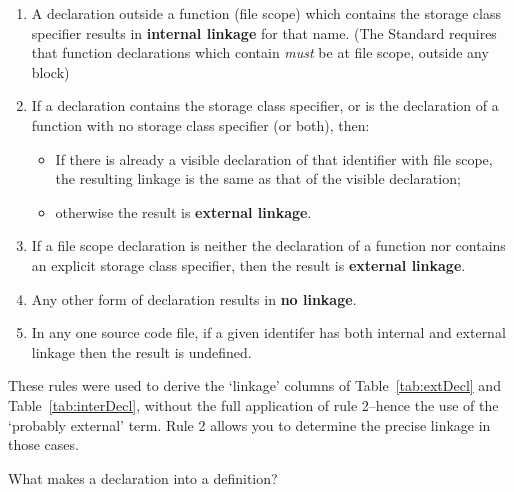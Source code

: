    \begin{enumerate}
    \item A declaration outside a function (file scope) which contains the
     \static{} storage class specifier results in \textbf{internal linkage}
     for that name. (The Standard requires that function declarations which
     contain \static{} \textit{must} be at file scope, outside any
     block)

    \item If a declaration contains the \extern{} storage class
     specifier, or is the declaration of a function with no storage class
     specifier (or both), then:

     \begin{itemize}
      \item If there is already a visible declaration of that identifier
       with file scope, the resulting linkage is the same as that of
       the visible declaration;

      \item otherwise the result is \textbf{external linkage}.
     \end{itemize}
    

    \item If a file scope declaration is neither the declaration of a
     function nor contains an explicit storage class specifier, then the
     result is \textbf{external linkage}.

    \item Any other form of declaration results in \textbf{no linkage}.

    \item In any one source code file, if a given identifer has both internal
     and external linkage then the result is undefined.
   \end{enumerate}

   These rules were used to derive the `linkage' columns of
     Table~\ref{tab:extDecl} and Table~\ref{tab:interDecl}, without the full
    application of rule 2--hence the use of the `probably
    external' term. Rule 2 allows you to determine the precise linkage in
    those cases.


   What makes a declaration into a definition?


